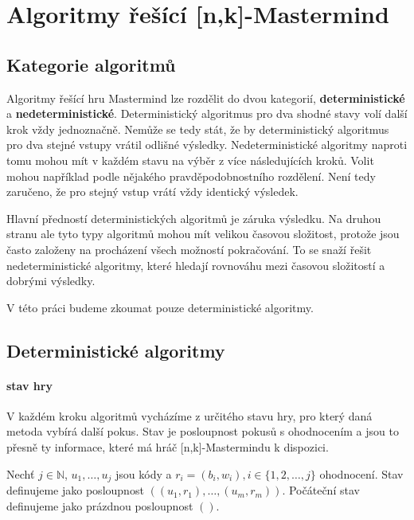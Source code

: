 \chapter{Algoritmy řešící [n,k]-Mastermind}

\section{Kategorie algoritmů}
Algoritmy řešící hru Mastermind lze rozdělit do dvou kategorií, \textbf{deterministické} a \textbf{nedeterministické}. Deterministický algoritmus pro dva shodné stavy volí další krok vždy jednoznačně. Nemůže se tedy stát, že by deterministický algoritmus pro dva stejné vstupy vrátil odlišné výsledky. Nedeterministické algoritmy naproti tomu mohou mít v každém stavu na výběr z více následujících kroků. Volit mohou například podle nějakého pravděpodobnostního rozdělení. Není tedy zaručeno, že pro stejný vstup vrátí vždy identický výsledek.

Hlavní předností deterministických algoritmů je záruka výsledku. Na druhou stranu ale tyto typy algoritmů mohou mít velikou časovou složitost, protože jsou často založeny na procházení všech možností pokračování. To se snaží řešit nedeterministické algoritmy, které hledají rovnováhu mezi časovou složitostí a dobrými výsledky. 

V této práci budeme zkoumat pouze deterministické algoritmy. 



\section{Deterministické algoritmy}

\subsubsection{stav hry}
V každém kroku algoritmů vycházíme z určitého stavu hry, pro který daná metoda vybírá další pokus. Stav je posloupnost pokusů s ohodnocením a jsou to přesně ty informace, které má hráč [n,k]-Mastermindu k dispozici.

\begin{definice}[Stav]\label{stav}
   Nechť $j \in \mathbb{N}$, $u_1, \dots , u_j$ jsou kódy a $r_i = (b_i,w_i), i \in \{1,2,\dots,j\}$ ohodnocení. Stav definujeme jako posloupnost $((u_1, r_1), \dots, (u_m, r_m))$. Počáteční stav definujeme jako prázdnou posloupnost $()$.
\end{definice}

